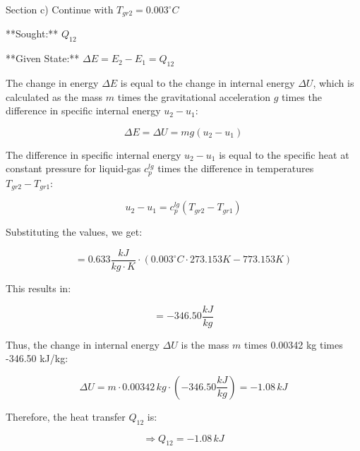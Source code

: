 Section c) Continue with \( T_{gr2} = 0.003^\circ C \)

**Sought:** \( Q_{12} \)

**Given State:** \( \Delta E = E_2 - E_1 = Q_{12} \)

The change in energy \( \Delta E \) is equal to the change in internal energy \( \Delta U \), which is calculated as the mass \( m \) times the gravitational acceleration \( g \) times the difference in specific internal energy \( u_2 - u_1 \):

\[
\Delta E = \Delta U = m g (u_2 - u_1)
\]

The difference in specific internal energy \( u_2 - u_1 \) is equal to the specific heat at constant pressure for liquid-gas \( c_p^{lg} \) times the difference in temperatures \( T_{gr2} - T_{gr1} \):

\[
u_2 - u_1 = c_p^{lg} (T_{gr2} - T_{gr1})
\]

Substituting the values, we get:

\[
= 0.633 \frac{kJ}{kg \cdot K} \cdot (0.003^\circ C \cdot 273.153 K - 773.153 K)
\]

This results in:

\[
= -346.50 \frac{kJ}{kg}
\]

Thus, the change in internal energy \( \Delta U \) is the mass \( m \) times 0.00342 kg times -346.50 kJ/kg:

\[
\Delta U = m \cdot 0.00342 \, kg \cdot (-346.50 \frac{kJ}{kg}) = -1.08 \, kJ
\]

Therefore, the heat transfer \( Q_{12} \) is:

\[
\Rightarrow Q_{12} = -1.08 \, kJ
\]